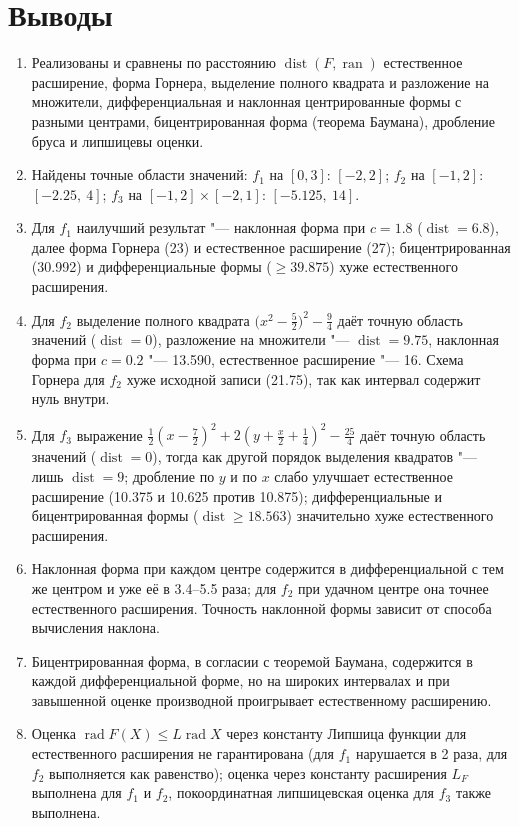 \documentclass[12pt,a4paper]{article}
\newcommand{\ran}{\operatorname{ran}}
\newcommand{\rad}{\operatorname{rad}}
\newcommand{\dist}{\operatorname{dist}}
\begin{document}
\section{Выводы}
\begin{enumerate}
\item Реализованы и сравнены по расстоянию $\dist(F,\ran)$ естественное расширение, форма Горнера, выделение полного квадрата и разложение на множители, дифференциальная и наклонная центрированные формы с разными центрами, бицентрированная форма (теорема Баумана), дробление бруса и липшицевы оценки.
\item Найдены точные области значений: $f_1$ на $[0,3]$: $[-2,2]$; $f_2$ на $[-1,2]$: $[-2.25,\ 4]$; $f_3$ на $[-1,2]\times[-2,1]$: $[-5.125,\ 14]$.
\item Для $f_1$ наилучший результат "--- наклонная форма при $c=1.8$ ($\dist=6.8$), далее форма Горнера (23) и естественное расширение (27); бицентрированная (30.992) и дифференциальные формы ($\ge39.875$) хуже естественного расширения.
\item Для $f_2$ выделение полного квадрата $\bigl(x^2-\frac52\bigr)^2-\frac94$ даёт точную область значений ($\dist=0$), разложение на множители "--- $\dist=9.75$, наклонная форма при $c=0.2$ "--- 13.590, естественное расширение "--- 16. Схема Горнера для $f_2$ хуже исходной записи (21.75), так как интервал содержит нуль внутри.
\item Для $f_3$ выражение $\frac12(x-\frac72)^2+2(y+\frac x2+\frac14)^2-\frac{25}4$ даёт точную область значений ($\dist=0$), тогда как другой порядок выделения квадратов "--- лишь $\dist=9$; дробление по $y$ и по $x$ слабо улучшает естественное расширение (10.375 и 10.625 против 10.875); дифференциальные и бицентрированная формы ($\dist\ge18.563$) значительно хуже естественного расширения.
\item Наклонная форма при каждом центре содержится в дифференциальной с тем же центром и уже её в 3.4--5.5 раза; для $f_2$ при удачном центре она точнее естественного расширения. Точность наклонной формы зависит от способа вычисления наклона.
\item Бицентрированная форма, в согласии с теоремой Баумана, содержится в каждой дифференциальной форме, но на широких интервалах и при завышенной оценке производной проигрывает естественному расширению.
\item Оценка $\rad F(X)\le L\rad X$ через константу Липшица функции для естественного расширения не гарантирована (для $f_1$ нарушается в 2 раза, для $f_2$ выполняется как равенство); оценка через константу расширения $L_F$ выполнена для $f_1$ и $f_2$, покоординатная липшицевская оценка для $f_3$ также выполнена.
\end{enumerate}
\end{document}
